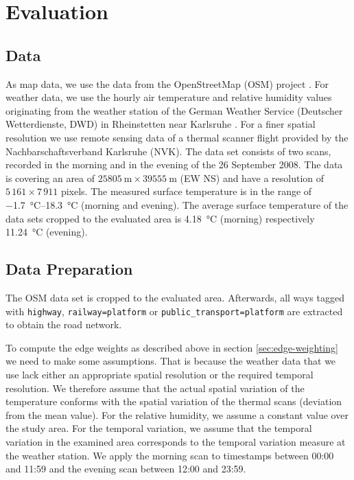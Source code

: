 
\section{Evaluation}

\subsection{Data}
\label{sec:data-sets}
As map data, we use the data from the OpenStreetMap (OSM) project \parencite{OSMF2016}. 
For weather data, we use the hourly air temperature and relative humidity values originating from the weather station of the German Weather Service (Deutscher Wetterdienste, DWD) in Rheinstetten near Karlsruhe \parencite{DWD2016}. For a finer spatial resolution we use remote sensing data of a thermal scanner flight provided by the Nachbarschaftsverband Karlsruhe (NVK). The data set consists of two scans, recorded in the morning and in the evening of the 26 September 2008. The data is covering an area of  $\SI{25 805}{\meter} \times \SI{39 555}{\meter}$ (EW NS) and have a resolution of $5\,161 \times 7\,911$  pixels. The measured surface temperature is in the range of \SIrange{-1.7}{18.3}{\celsius} (morning and evening). The average surface temperature of the data sets cropped to the evaluated area is \SI{4.18}{\celsius} (morning) respectively \SI{11.24}{\celsius} (evening).  


\subsection{Data Preparation}
The OSM data set is cropped to the evaluated area. Afterwards, all ways tagged with \verb|highway|, \verb|railway=platform| or \verb|public_transport=platform| are extracted to obtain the road network.

To compute the edge weights as described above in section \ref{sec:edge-weighting} we need to make some assumptions. That is because the weather data that we use lack either an appropriate spatial resolution or the required temporal resolution. We therefore assume that the actual spatial variation of the temperature conforms with the spatial variation of the thermal scans (deviation from the mean value). For the relative humidity, we assume a constant value over the study area. For the temporal variation, we assume that the temporal variation in the examined area corresponds to the temporal variation measure at the weather station. We apply the morning scan to timestamps between  00:00 and 11:59 and the evening scan between 12:00 and 23:59.

